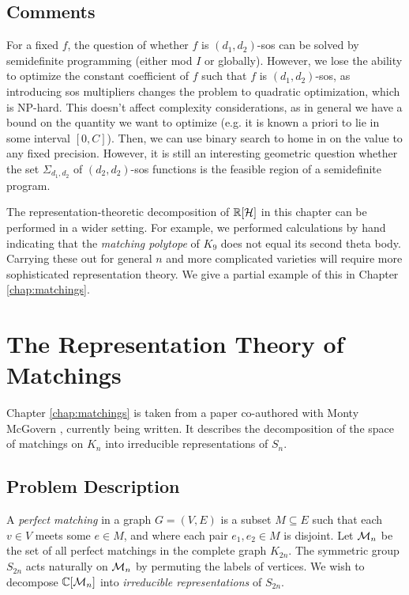 \subsection{Comments}
For a fixed $f$, the question of whether $f$ is $(d_1,d_2)$-sos can be solved by semidefinite programming (either mod $I$ or globally).
However, we lose the ability to optimize the constant coefficient of $f$ such that $f$ is $(d_1,d_2)$-sos, as introducing sos multipliers changes the problem to quadratic optimization, which is NP-hard.
This doesn't affect complexity considerations, as in general we have a bound on the quantity we want to optimize (e.g. it is known a priori to lie in some interval $[0,C]$).
Then, we can use binary search to home in on the value to any fixed precision.
However, it is still an interesting geometric question whether the set $\Sigma_{d_1,d_2}$ of $(d_2,d_2)$-sos functions is the feasible region of a semidefinite program. %

The representation-theoretic decomposition of $\mathbb{R}[\mathcal{H}]$ in this chapter can be performed in a wider setting.
For example, we performed calculations by hand indicating that the {\em matching polytope} of $K_9$ does not equal its second theta body.
Carrying these out for general $n$ and more complicated varieties will require more sophisticated representation theory.
We give a partial example of this in Chapter \ref{chap:matchings}.


\section{The Representation Theory of Matchings}
Chapter \ref{chap:matchings} is taken from a paper co-authored with Monty McGovern \cite{matchingspaper}, currently being written. %
It describes the decomposition of the space of matchings on $K_n$ into irreducible representations of $S_n$.

\subsection{Problem Description}
A {\em perfect matching} in a graph $G=(V,E)$ is a subset $M \subseteq E$ such that each $v \in V$ meets some $e \in M$, and where each pair $e_1,e_2 \in M$ is disjoint.
Let $\mathcal{M}_{n}$ be the set of all perfect matchings in the complete graph $K_{2n}$.
The symmetric group $S_{2n}$ acts naturally on $\mathcal{M}_{n}$ by permuting the labels of vertices.
We wish to decompose $\mathbb{C}[\mathcal{M}_{n}]$ into {\em irreducible representations} of $S_{2n}$.

